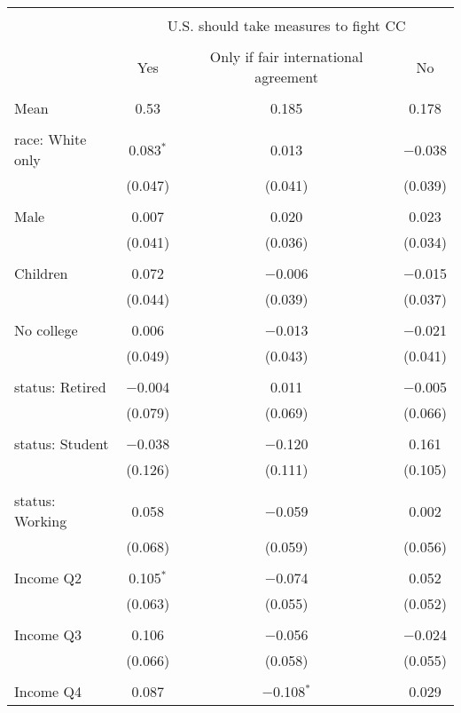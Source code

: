 
\begin{tabular}{@{\extracolsep{5pt}}lccc} 
\\[-1.8ex]\hline 
\hline \\[-1.8ex] 
 & \multicolumn{3}{c}{U.S. should take measures to fight CC} \\ 
\cline{2-4} 
\\[-1.8ex] & Yes & Only if fair international agreement & No \\ 
\hline \\[-1.8ex] 
 Mean & 0.53 & 0.185 & 0.178  \\ \hline \\[-1.8ex] race: White only & 0.083$^{*}$ & 0.013 & $-$0.038 \\ 
  & (0.047) & (0.041) & (0.039) \\ 
  & & & \\ 
 Male & 0.007 & 0.020 & 0.023 \\ 
  & (0.041) & (0.036) & (0.034) \\ 
  & & & \\ 
 Children & 0.072 & $-$0.006 & $-$0.015 \\ 
  & (0.044) & (0.039) & (0.037) \\ 
  & & & \\ 
 No college & 0.006 & $-$0.013 & $-$0.021 \\ 
  & (0.049) & (0.043) & (0.041) \\ 
  & & & \\ 
 status: Retired & $-$0.004 & 0.011 & $-$0.005 \\ 
  & (0.079) & (0.069) & (0.066) \\ 
  & & & \\ 
 status: Student & $-$0.038 & $-$0.120 & 0.161 \\ 
  & (0.126) & (0.111) & (0.105) \\ 
  & & & \\ 
 status: Working & 0.058 & $-$0.059 & 0.002 \\ 
  & (0.068) & (0.059) & (0.056) \\ 
  & & & \\ 
 Income Q2 & 0.105$^{*}$ & $-$0.074 & 0.052 \\ 
  & (0.063) & (0.055) & (0.052) \\ 
  & & & \\ 
 Income Q3 & 0.106 & $-$0.056 & $-$0.024 \\ 
  & (0.066) & (0.058) & (0.055) \\ 
  & & & \\ 
 Income Q4 & 0.087 & $-$0.108$^{*}$ & 0.029 \\ 

\end{tabular}
